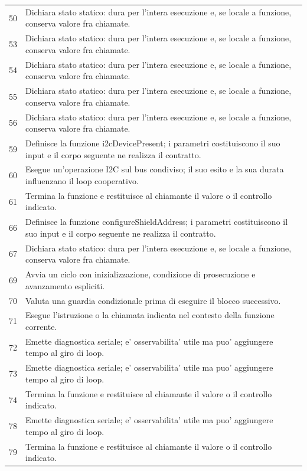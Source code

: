 \documentclass[11pt,a4paper]{article}
\begin{document}
\begin{longtable}{p{}p{}}
50 & Dichiara stato statico: dura per l'intera esecuzione e, se locale a funzione, conserva valore fra chiamate. \\
53 & Dichiara stato statico: dura per l'intera esecuzione e, se locale a funzione, conserva valore fra chiamate. \\
54 & Dichiara stato statico: dura per l'intera esecuzione e, se locale a funzione, conserva valore fra chiamate. \\
55 & Dichiara stato statico: dura per l'intera esecuzione e, se locale a funzione, conserva valore fra chiamate. \\
56 & Dichiara stato statico: dura per l'intera esecuzione e, se locale a funzione, conserva valore fra chiamate. \\
59 & Definisce la funzione i2cDevicePresent; i parametri costituiscono il suo input e il corpo seguente ne realizza il contratto. \\
60 & Esegue un'operazione I2C sul bus condiviso; il suo esito e la sua durata influenzano il loop cooperativo. \\
61 & Termina la funzione e restituisce al chiamante il valore o il controllo indicato. \\
66 & Definisce la funzione configureShieldAddress; i parametri costituiscono il suo input e il corpo seguente ne realizza il contratto. \\
67 & Dichiara stato statico: dura per l'intera esecuzione e, se locale a funzione, conserva valore fra chiamate. \\
69 & Avvia un ciclo con inizializzazione, condizione di prosecuzione e avanzamento espliciti. \\
70 & Valuta una guardia condizionale prima di eseguire il blocco successivo. \\
71 & Esegue l'istruzione o la chiamata indicata nel contesto della funzione corrente. \\
72 & Emette diagnostica seriale; e' osservabilita' utile ma puo' aggiungere tempo al giro di loop. \\
73 & Emette diagnostica seriale; e' osservabilita' utile ma puo' aggiungere tempo al giro di loop. \\
74 & Termina la funzione e restituisce al chiamante il valore o il controllo indicato. \\
78 & Emette diagnostica seriale; e' osservabilita' utile ma puo' aggiungere tempo al giro di loop. \\
79 & Termina la funzione e restituisce al chiamante il valore o il controllo indicato. \\

\end{longtable}
\end{document}

